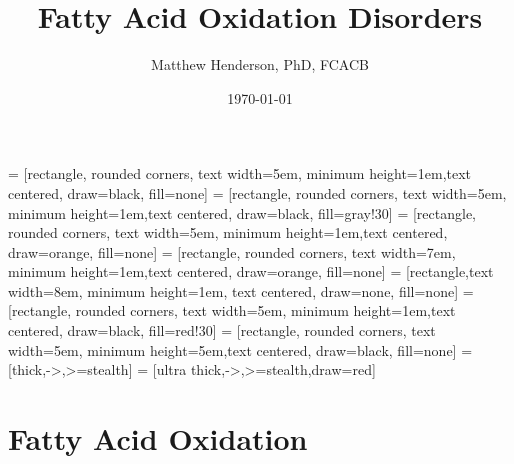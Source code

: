 \documentclass{scrartcl}
\author{Matthew Henderson, PhD, FCACB}
\date{\today}
\title{Fatty Acid Oxidation Disorders}
\begin{document}
\maketitle
\tableofcontents


 = [rectangle, rounded corners, text width=5em, minimum height=1em,text centered, draw=black, fill=none]
 = [rectangle, rounded corners, text width=5em, minimum height=1em,text centered, draw=black, fill=gray!30]
 = [rectangle, rounded corners, text width=5em, minimum height=1em,text centered, draw=orange, fill=none]
 = [rectangle, rounded corners, text width=7em, minimum height=1em,text centered, draw=orange, fill=none]
 = [rectangle,text width=8em, minimum height=1em, text centered, draw=none, fill=none]
 = [rectangle, rounded corners, text width=5em, minimum height=1em,text centered, draw=black, fill=red!30]
 = [rectangle, rounded corners, text width=5em, minimum height=5em,text centered, draw=black, fill=none]
 = [thick,->,>=stealth]
 = [ultra thick,->,>=stealth,draw=red]


\section{Fatty Acid Oxidation}
\label{sec:org40294ba}
\end{document}
